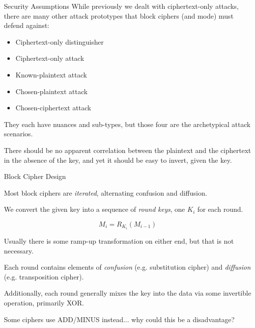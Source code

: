 \documentclass{beamer}
\begin{document}
\begin{frame}{Security Assumptions}
	While previously we dealt with ciphertext-only attacks, there are many other
	attack prototypes that block ciphers (and mode) must defend against:

	\begin{itemize}
		\item Ciphertext-only distinguisher
		\item Ciphertext-only attack
		\item Known-plaintext attack
		\item Chosen-plaintext attack
		\item Chosen-ciphertext attack
	\end{itemize}

	They each have nuances and sub-types, but those four are the archetypical
	attack scenarios.

	\begin{block}{}
		There should be no apparent correlation between the plaintext and the
		ciphertext in the absence of the key, and yet it should be easy to
		invert, given the key.
	\end{block}
\end{frame}

\begin{frame}{Block Cipher Design}
	\begin{block}{}
		Most block ciphers are \textit{iterated}, alternating confusion and
		diffusion.

		We convert the given key into a sequence of \textit{round keys}, one
		$K_i$ for each round.

		\[ M_i = R_{K_i}(M_{i-1}) \]

		Usually there is some ramp-up transformation on either end, but that is
		not necessary.
	\end{block}

	Each round contains elements of \textit{confusion} (e.g. substitution
	cipher) and \textit{diffusion} (e.g. transposition cipher).

	Additionally, each round generally mixes the key into the data via some
	invertible operation, primarily XOR.

	Some ciphers use ADD/MINUS instead... why could this be a disadvantage?


\end{frame}
\end{document}
